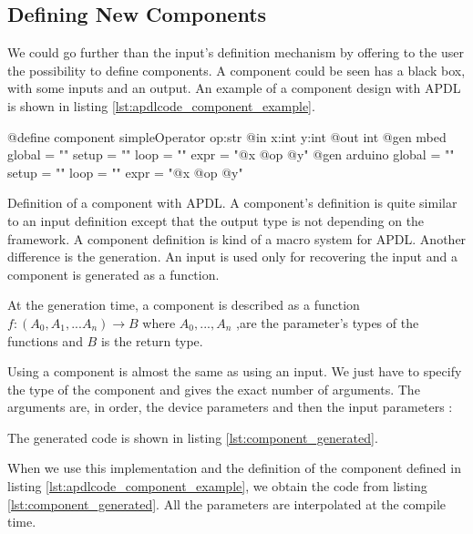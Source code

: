 \subsection{Defining New Components}
\label{sec:defining_component}

We could go further than the input's definition mechanism by offering to the
user the possibility to define components. A component could be seen has a
black box, with some inputs and an output. An example of a component design with
\gls{APDL} is shown in listing \ref{lst:apdlcode_component_example}.

\begin{listing}[H]
  \centering
\begin{apdlcode}
@define component simpleOperator op:str {
    @in x:int y:int
    @out int
    @gen mbed {
        global = ""
        setup = ""
        loop = ""
        expr = "@x @op @y"
    }
    @gen arduino {
        global = ""
        setup = ""
        loop = ""
        expr = "@x @op @y"
    }
}
\end{apdlcode}
  \caption[Definition of a component with \gls{APDL}]{Definition of a component
with \gls{APDL}. A component's definition is quite similar to an input
definition except that the output type is not depending on the framework. A
component definition is kind of a macro system for \gls{APDL}. Another
difference is the generation. An input is used only for recovering the input and
a component is generated as a function.}
  \label{lst:apdlcode_component_example}
\end{listing}

At the generation time, a component is described as a function $f :
(A_0,A_1,...A_n) \rightarrow B$ where $A_0,...,A_n$ ,are the parameter's types of
the functions and $B$ is the return type.

Using a component is almost the same as using an input. We just have to
specify the type of the component and gives the exact number of arguments.
The arguments are, in order, the device parameters and then the input parameters :


The generated code is shown in listing \ref{lst:component_generated}.

When we use this implementation and the definition of the component defined in
listing \ref{lst:apdlcode_component_example}, we obtain the code from listing
\ref{lst:component_generated}. All the parameters are interpolated at the
compile time.

